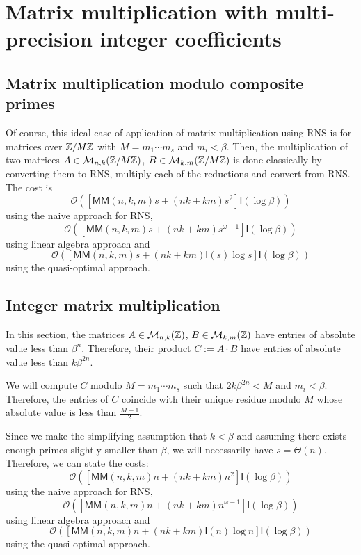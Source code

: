 \documentclass[acmtoms,acmnow]{acmtrans2m}
\def\M{\mathsf{M}} \def\I{\mathsf{I}} \def\R{\mathsf{R}} \def\Q{\mathbb{Q}}
\def\Mat{\mathcal{M}}
\def\bigO{{\ensuremath{\mathcal{O}}}}
\newcommand{\assign}{:=}
\begin{document}
\section{Matrix multiplication with multi-precision integer coefficients}

\subsection{Matrix multiplication modulo composite primes}

Of course, this ideal case of application of matrix multiplication using RNS is
for matrices over $\mathbb{Z}/M\mathbb{Z}$ with $M=m_1 \cdots m_s$ and $m_i < \beta$. Then, the
multiplication of two matrices $A \in \Mat_{n,k}(\Z/M\Z)$,
$B \in \Mat_{k,m}(\Z/M\Z)$ is done classically by converting them to RNS,
multiply each of the reductions and convert from RNS. The cost is
$$\bigO( \left[\M\M(n,k,m) s + (nk + km) s^{2} \right] \I(\log \beta))$$ using the
naive approach for RNS,
$$\bigO( \left[\M\M(n,k,m) s + (nk + km) s^{\omega-1} \right] \I(\log \beta))$$
using linear algebra approach and
$$\bigO( \left[\M\M(n,k,m) s + (nk + km) \I(s) \log s \right] \I(\log \beta))$$
using the quasi-optimal approach.

\subsection{Integer matrix multiplication}\label{ssec:imm}

In this section, the matrices $A \in \Mat_{n,k}(\Z)$, $B \in \Mat_{k,m}(\Z)$
have entries of absolute value less than $\beta^n$.  Therefore, their product
$C \assign A \cdot B$ have entries of absolute value less than $k \beta^{2n}$.

We will compute $C$ modulo $M=m_1 \cdots m_s$ such that $2 k \beta^{2n} < M$ and
$m_i < \beta$. Therefore, the entries of $C$ coincide with their unique residue
modulo $M$ whose absolute value is less than $\frac{M-1}{2}$.

Since we make the simplifying assumption that $k < \beta$ and
assuming there exists enough primes slightly smaller than $\beta$, we will
necessarily have $s = \Theta(n)$. Therefore, we can state the costs:
$$\bigO( \left[\M\M(n,k,m) n + (nk + km) n^{2} \right] \I(\log \beta))$$ using the
naive approach for RNS,
$$\bigO( \left[\M\M(n,k,m) n + (nk + km) n^{\omega-1} \right] \I(\log \beta))$$
using linear algebra approach and
$$\bigO( \left[\M\M(n,k,m) n + (nk + km) \I(n) \log n \right] \I(\log \beta))$$
using the quasi-optimal approach.
\end{document}
